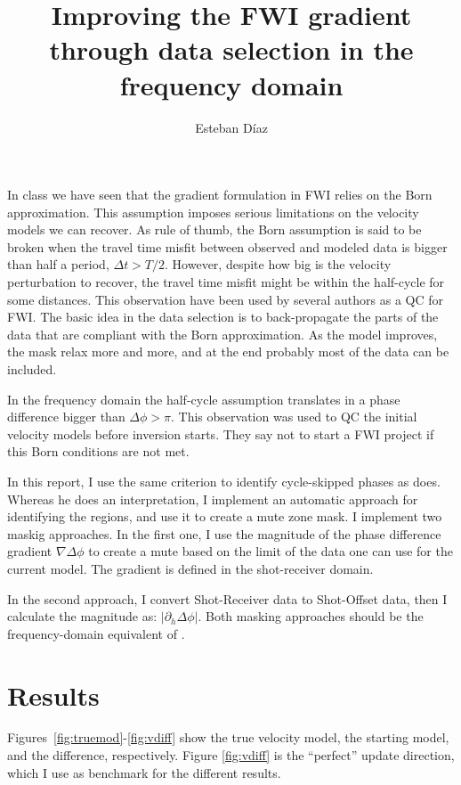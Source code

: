
\author{Esteban D\'{i}az}
\title{Improving the FWI gradient through data selection in the frequency domain}

\maketitle

In class we have seen that the gradient formulation in FWI relies on the 
Born approximation. This assumption imposes serious limitations on the velocity
models we can recover. As rule of thumb, the Born assumption is said to be broken
when the travel time misfit between observed and modeled data is bigger than
half a period, $\Delta t > T/2$. However, despite how big is the velocity perturbation to recover,
 the travel time misfit might be within the half-cycle for some distances. 
This observation have been used by several authors  \citep{liu2014,alejo} as a QC for FWI. The 
basic idea in the data selection is to back-propagate the parts of the data that are
compliant with the Born approximation. As the model improves, the mask relax more and more, 
and at the end probably most of the data can be included.

In the frequency domain the half-cycle assumption translates in a phase difference bigger 
than $\Delta \phi > \pi$. This observation was used \cite{qa-fwi}
to QC the initial velocity models before inversion starts. They say not to start a FWI 
project if this Born conditions are not met.

In this report, I use the same criterion to identify cycle-skipped phases as \cite{qa-fwi}
does. Whereas he does an interpretation, I implement an automatic approach for identifying the 
regions, and use it to create a mute zone mask. 
  I implement two maskig approaches.
 In the first one, I use the magnitude of the phase difference gradient $\nabla \Delta \phi$
to create a mute based on the limit of the data one can use for the current model. The 
gradient is defined in the shot-receiver domain. 

In the second approach, I convert Shot-Receiver data to Shot-Offset data, then I calculate 
the magnitude as: $\left | \partial_h \Delta \phi \right |$. 
Both masking approaches should be the frequency-domain equivalent of \cite{liu2014,alejo}.

\section{Results}
 Figures~\ref{fig:truemod}-\ref{fig:vdiff} show the true velocity model, the starting model,
and the difference, respectively. Figure \ref{fig:vdiff} is the ``perfect'' update direction,
 which I use as benchmark for the different results. 

